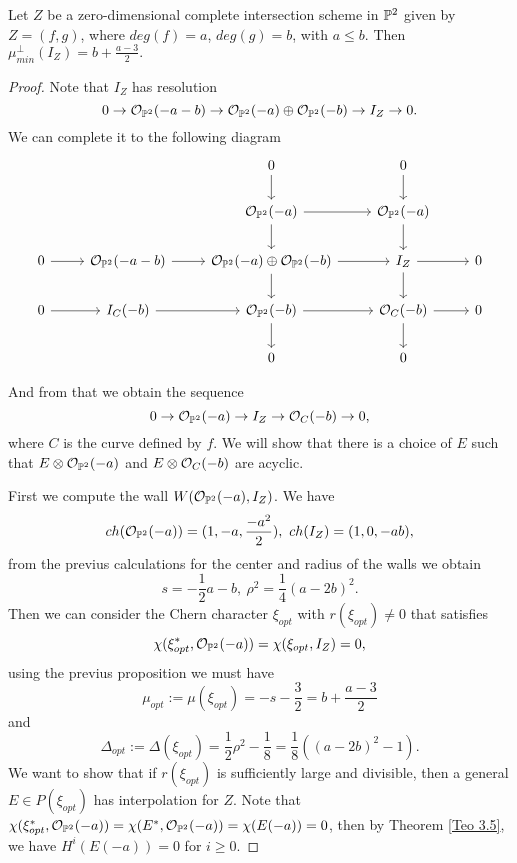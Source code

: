 \documentclass[
	oldfontcommands,
	sumario=abnt-6027-2012,
	12pt,			%
	openright,		%
	oneside,		%
	a4paper,		%
	english,		%
	brazil			%
	]{imecc-unicamp}
\begin{document}
\begin{teorema}
	Let $Z$ be a zero-dimensional complete intersection scheme in ${\mathbb P}^2$ given by $Z=(f,g)$, where $deg(f)=a$, $deg(g)=b$, with $a\le b$. Then $\mu_{min}^\perp(I_Z)=b+\frac{a-3}{2}.$
\end{teorema}
\begin{proof}
	Note that $I_Z$ has resolution
	$$
	0\rightarrow {\mathcal O}_{{\mathbb P}^2}(-a-b)\rightarrow{\mathcal O}_{{\mathbb P}^2}(-a)\oplus{\mathcal O}_{{\mathbb P}^2}(-b)\rightarrow I_Z\rightarrow 0. 
	$$
	We can complete it to the following diagram $$
	\begin{tikzcd}
	&                                          & 0 \arrow[d]                                                                         & 0 \arrow[d]                            &   \\
	&                                          & \mathcal O_{\mathbb P^2}(-a) \arrow[d] \arrow[r]                                    & \mathcal O_{\mathbb P^2}(-a) \arrow[d] &   \\
	0 \arrow[r] & \mathcal O_{\mathbb P^2}(-a-b) \arrow[r] & \mathcal O_{\mathbb P^2}(-a)\oplus \mathcal O_{\mathbb P^2}(-b) \arrow[r] \arrow[d] & I_Z \arrow[r] \arrow[d]                & 0 \\
	0 \arrow[r] & I_C(-b) \arrow[r]                        & \mathcal O_{\mathbb P^2}(-b) \arrow[r] \arrow[d]                                    & \mathcal O_{C}(-b) \arrow[r] \arrow[d] & 0 \\
	&                                          & 0                                                                                   & 0                                      &  
	\end{tikzcd}
	$$
	
	
	And from that we obtain the sequence $$
	0\rightarrow {\mathcal O}_{{\mathbb P}^2}(-a)\rightarrow I_Z\rightarrow {\mathcal O}_C(-b)\rightarrow 0,
	$$
	where $C$ is the curve defined by $f$. We will show that there is a choice of $E$ such that $E\otimes {\mathcal O}_{{\mathbb P}^2}(-a)$ and $E\otimes{\mathcal O}_C(-b)$ are acyclic.
	
	First we compute the wall $W({\mathcal O}_{{\mathbb P}^2}(-a),I_Z)$. We have $$
	ch({\mathcal O}_{{\mathbb P}^2}(-a))=(1,-a,\frac{-a^2}{2}), ~ch(I_Z)=(1,0,-ab),
	$$
	from the previus calculations for the center and radius of the walls we obtain $$
	s=-\frac{1}{2}a-b,~\rho^2=\frac{1}{4}(a-2b)^2.
	$$
	Then we can consider the Chern character $\xi_{opt}$ with $r(\xi_{opt})\neq 0$ that satisfies $$
	\chi(\xi_{opt}^*,{\mathcal O}_{{\mathbb P}^2}(-a))=\chi(\xi_{opt},I_Z)=0,
	$$
	using the previus proposition we must have $$
	\mu_{opt}:=\mu(\xi_{opt})=-s-\frac{3}{2}=b+\frac{a-3}{2}
	$$
	and $$
	\Delta_{opt}:=\Delta(\xi_{opt})=\frac{1}{2}\rho^2-\frac{1}{8}=\frac{1}{8}((a-2b)^2-1).
	$$
	We want to show that if $r(\xi_{opt})$ is sufficiently large and divisible, then a general $E\in P(\xi_{opt})$ has interpolation for $Z$. Note that $\chi(\xi_{opt}^*,{\mathcal O}_{{\mathbb P}^2}(-a))=\chi(E^*,{\mathcal O}_{{\mathbb P}^2}(-a))=\chi(E(-a))=0$, then by Theorem \ref{Teo 3.5}, we have $H^i(E(-a))=0$ for $i\geq0$.
	

\end{proof}
\end{document}
